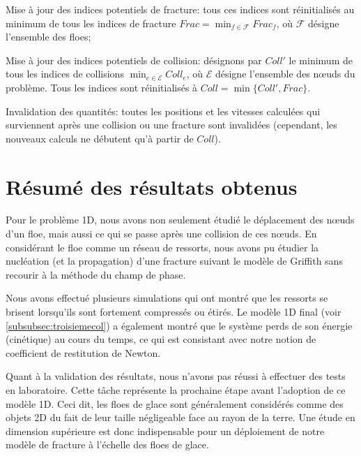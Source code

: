 \begin{algorithm}[H]
{        Mise à jour des indices potentiels de fracture: tous ces indices sont réinitialisés au minimum de tous les indices de fracture $Frac = \min_{f \in \mathcal{F}} Frac_f$, où $\mathcal{F}$ désigne l'ensemble des floes;

        Mise à jour des indices potentiels de collision: désignons par $Coll'$ le minimum de tous les indices de collisions $\min_{e \in \mathcal{E}} Coll_e$, où $\mathcal{E}$ désigne l'ensemble des n\oe{}uds du problème. Tous les indices sont réinitialisés à $Coll = \min \{ Coll', Frac \}$.
        
        Invalidation des quantités: toutes les positions et les vitesses calculées qui surviennent après une collision ou une fracture sont invalidées (cependant, les nouveaux calculs ne débutent qu'à partir de $Coll$).
        }
\end{algorithm}




\section{Résumé des résultats obtenus}


Pour le problème 1D, nous avons non seulement étudié le déplacement des n\oe{}uds d'un floe, mais aussi ce qui se passe après une collision de ces n\oe{}uds. En considérant le floe comme un réseau de ressorts, nous avons pu étudier la nucléation (et la propagation) d'une fracture suivant le modèle de Griffith sans recourir à la méthode du champ de phase.

Nous avons effectué plusieurs simulations qui ont montré que les ressorts se brisent lorsqu'ils sont fortement compressés ou étirés. Le modèle 1D final (voir \cref{subsubsec:troisiemecol}) a également montré que le système perds de son énergie (cinétique) au cours du temps, ce qui est consistant avec notre notion de coefficient de restitution de Newton.

Quant à la validation des résultats, nous n'avons pas réussi à effectuer des tests en laboratoire. Cette tâche représente la prochaine étape avant l'adoption de ce modèle 1D. Ceci dit, les floes de glace sont généralement considérés comme des objets 2D du fait de leur taille négligeable face au rayon de la terre. Une étude en dimension supérieure est donc indispensable pour un déploiement de notre modèle de fracture à l'échelle des floes de glace.










